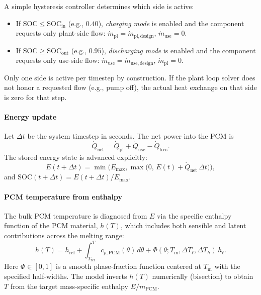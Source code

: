 A simple hysteresis controller determines which side is active:
\begin{itemize}
  \item If $\mathrm{SOC} \le \mathrm{SOC}_{\mathrm{in}}$ (e.g., $0.40$), \emph{charging mode} is enabled and the component requests only plant-side flow: $\dot m_{\mathrm{pl}} = \dot m_{\mathrm{pl,design}}$, $\dot m_{\mathrm{use}} = 0$.
  \item If $\mathrm{SOC} \ge \mathrm{SOC}_{\mathrm{out}}$ (e.g., $0.95$), \emph{discharging mode} is enabled and the component requests only use-side flow: $\dot m_{\mathrm{use}} = \dot m_{\mathrm{use,design}}$, $\dot m_{\mathrm{pl}} = 0$.
\end{itemize}
Only one side is active per timestep by construction. If the plant loop solver does not honor a requested flow (e.g., pump off), the actual heat exchange on that side is zero for that step.

\paragraph{Energy update}\label{pcm-energy-update}

Let $\Delta t$ be the system timestep in seconds. The net power into the PCM is
\begin{equation}
\dot Q_{\mathrm{net}} = \dot Q_{\mathrm{pl}} + \dot Q_{\mathrm{use}} - \dot Q_{\mathrm{loss}}.
\end{equation}
The stored energy state is advanced explicitly:
\begin{equation}
E(t+\Delta t) = \min\!\bigl(E_{\max}, \max\!\bigl(0,\, E(t) + \dot Q_{\mathrm{net}} \,\Delta t \bigr)\bigr),
\end{equation}
and $\mathrm{SOC}(t+\Delta t) = E(t+\Delta t)/E_{\max}$.

\paragraph{PCM temperature from enthalpy}\label{pcm-temp-from-enthalpy}

The bulk PCM temperature is diagnosed from $E$ via the specific enthalpy function of the PCM material, $h(T)$, which includes both sensible and latent contributions across the melting range:
\begin{equation}
h(T) = h_\mathrm{ref} + \int_{T_\mathrm{ref}}^{T} c_{p,\mathrm{PCM}}(\theta)\, d\theta + \Phi(\theta; T_\mathrm{m}, \Delta T_{\ell}, \Delta T_h) \, h_{\ell}.
\end{equation}
Here $\Phi\in[0,1]$ is a smooth phase-fraction function centered at $T_\mathrm{m}$ with the specified half-widths. The model inverts $h(T)$ numerically (bisection) to obtain $T$ from the target mass-specific enthalpy $E/m_{\mathrm{PCM}}$.

